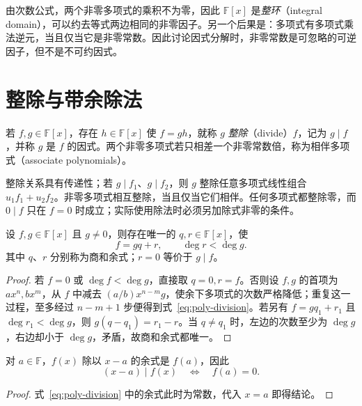 由次数公式，两个非零多项式的乘积不为零，因此 $\mathbb F[x]$ 是\emph{整环}（integral domain），可以约去等式两边相同的非零因子。另一个后果是：多项式有多项式乘法逆元，当且仅当它是非零常数。因此讨论因式分解时，非零常数是可忽略的可逆因子，但不是不可约因式。

\section{整除与带余除法}
\label{sec:poly-division}

\begin{definition}
若 $f,g\in\mathbb F[x]$，存在 $h\in\mathbb F[x]$ 使 $f=gh$，就称 $g$ \emph{整除}（divide）$f$，记为 $g\mid f$，并称 $g$ 是 $f$ 的因式。两个非零多项式若只相差一个非零常数倍，称为相伴多项式（associate polynomials）。
\end{definition}

整除关系具有传递性；若 $g\mid f_1$、$g\mid f_2$，则 $g$ 整除任意多项式线性组合 $u_1f_1+u_2f_2$。非零多项式相互整除，当且仅当它们相伴。任何多项式都整除零，而 $0\mid f$ 只在 $f=0$ 时成立；实际使用除法时必须另加除式非零的条件。

\begin{theorem}[带余除法]
\label{thm:poly-division}
设 $f,g\in\mathbb F[x]$ 且 $g\ne0$，则存在唯一的 $q,r\in\mathbb F[x]$，使
\begin{equation}
\label{eq:poly-division}
    f=gq+r,\qquad \deg r<\deg g.
\end{equation}
其中 $q$、$r$ 分别称为商和余式；$r=0$ 等价于 $g\mid f$。
\end{theorem}
\begin{proof}
若 $f=0$ 或 $\deg f<\deg g$，直接取 $q=0,r=f$。否则设 $f,g$ 的首项为 $ax^n,bx^m$，从 $f$ 中减去 $(a/b)x^{n-m}g$，使余下多项式的次数严格降低；重复这一过程，至多经过 $n-m+1$ 步便得到式~\eqref{eq:poly-division}。若另有 $f=gq_1+r_1$ 且 $\deg r_1<\deg g$，则 $g(q-q_1)=r_1-r$。当 $q\ne q_1$ 时，左边的次数至少为 $\deg g$，右边却小于 $\deg g$，矛盾，故商和余式都唯一。
\end{proof}

\begin{corollary}[余数定理与因式定理]
\label{cor:poly-remainder}
对 $a\in\mathbb F$，$f(x)$ 除以 $x-a$ 的余式是 $f(a)$，因此
\[
    (x-a)\mid f(x)\quad\Longleftrightarrow\quad f(a)=0.
\]
\end{corollary}
\begin{proof}
式~\eqref{eq:poly-division} 中的余式此时为常数，代入 $x=a$ 即得结论。
\end{proof}

